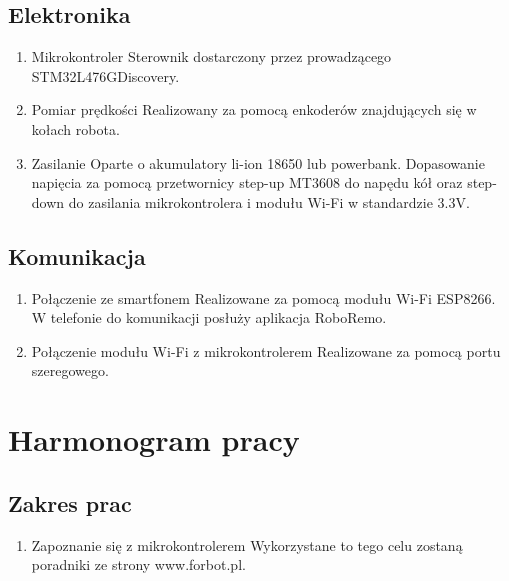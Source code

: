 \documentclass[10pt, a4paper]{article}
\begin{document}
	\subsection{Elektronika}
	\begin{enumerate}
		\item Mikrokontroler
		\newline
		Sterownik dostarczony przez prowadzącego STM32L476GDiscovery.
		
		\item Pomiar prędkości
		\newline
		Realizowany za pomocą enkoderów znajdujących się w kołach robota.
		
		\item Zasilanie
		\newline
		Oparte o akumulatory li-ion 18650 lub powerbank. Dopasowanie napięcia za pomocą przetwornicy step-up MT3608 do napędu kół oraz step-down do zasilania mikrokontrolera i modułu Wi-Fi w standardzie 3.3V.
	\end{enumerate}

	\subsection{Komunikacja}
	\begin{enumerate}
		\item Połączenie ze smartfonem
		\newline
		Realizowane za pomocą modułu Wi-Fi ESP8266. W telefonie do komunikacji posłuży aplikacja RoboRemo.
		\item Połączenie modułu Wi-Fi z mikrokontrolerem
		\newline
		Realizowane za pomocą portu szeregowego.
	\end{enumerate}
	

\section{Harmonogram pracy}

\subsection{Zakres prac}
	\begin{enumerate}
		\item Zapoznanie się z mikrokontrolerem
		\newline
		Wykorzystane to tego celu zostaną poradniki ze strony www.forbot.pl. \cite{kurs1, kurs2, kurs3}
	\end{enumerate}
\end{document}
